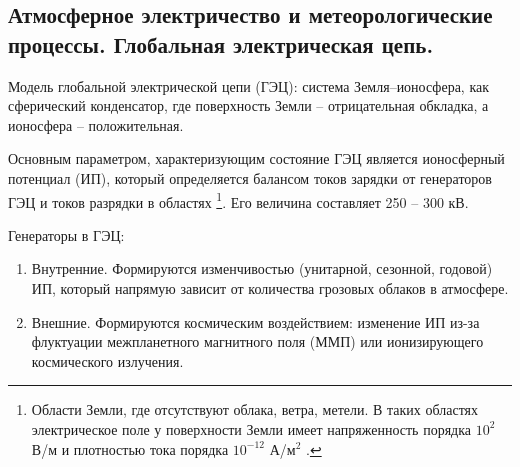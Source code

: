 \subsection{Атмосферное электричество и метеорологические процессы. Глобальная электрическая цепь.}
Модель глобальной электрической цепи (ГЭЦ): система Земля–ионосфера, как сферический конденсатор, где поверхность Земли -- отрицательная обкладка, а ионосфера -- положительная.

Основным параметром, характеризующим состояние ГЭЦ является ионосферный потенциал (ИП), который определяется балансом токов зарядки от генераторов ГЭЦ и токов разрядки в областях \footnote{Области Земли, где отсутствуют облака, ветра, метели. В таких областях электрическое поле у поверхности Земли имеет напряженность порядка $10^2$ В/м и плотностью тока порядка $10^{-12}$ А/$\text{м}^2$ \cite{Морозов-2011}.}.
Его величина составляет 250 -- 300 кВ.

Генераторы в ГЭЦ:
\begin{enumerate}
\item Внутренние. Формируются изменчивостью (унитарной, сезонной, годовой) ИП, который напрямую зависит от количества грозовых облаков в атмосфере.
\item Внешние. Формируются космическим воздействием: изменение ИП из-за флуктуации межпланетного магнитного поля (ММП) или ионизирующего космического излучения.
\end{enumerate}

